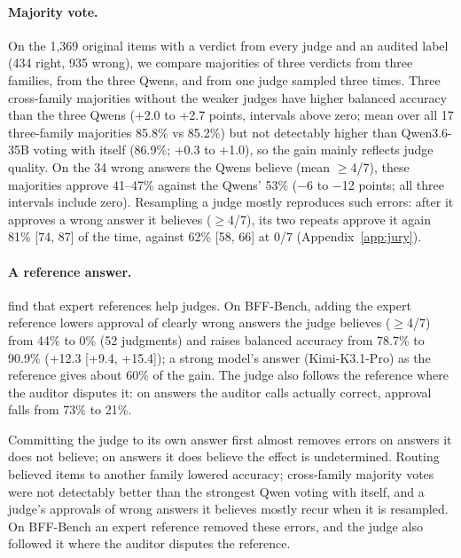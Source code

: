 \documentclass[11pt]{article}
\newcounter{takeaway}
\begin{document}
\paragraph{Majority vote.}
On the 1,369 original items with a verdict from every judge and an audited label (434 right, 935 wrong), we compare
majorities of three verdicts from three families, from the three Qwens, and from one judge sampled three times. Three
cross-family majorities without the weaker judges have higher balanced accuracy than the three Qwens (+2.0 to +2.7
points, intervals above zero; mean over all 17 three-family majorities 85.8\% vs 85.2\%) but not detectably higher
than Qwen3.6-35B voting with itself (86.9\%; +0.3 to +1.0), so the gain mainly reflects judge quality. On the 34
wrong answers the Qwens believe (mean $\geq$4/7), these majorities approve 41--47\% against the Qwens' 53\% ($-$6
to $-$12 points; all three intervals include zero). Resampling a judge mostly reproduces such errors: after it approves a
wrong answer it believes ($\geq$4/7), its two repeats approve it again 81\% [74, 87] of the time, against 62\% [58,
66] at 0/7 (Appendix~\ref{app:jury}).

\paragraph{A reference answer.}
\citet{krumdick2026nofreelabels} find that expert references help judges. On BFF-Bench, adding the expert reference
lowers approval of clearly wrong answers the judge believes ($\geq$4/7) from 44\% to 0\% (52 judgments) and raises
balanced accuracy from 78.7\% to 90.9\% (+12.3 [+9.4, +15.4]); a strong model's answer (Kimi-K3.1-Pro) as the
reference gives about 60\% of the gain. The judge also follows the reference where the auditor disputes it: on
answers the auditor calls actually correct, approval falls from 73\% to 21\%.

\begin{takeaway}
Committing the judge to its own answer first almost removes errors on answers it does not believe; on answers it does
believe the effect is undetermined. Routing believed items to another family lowered accuracy; cross-family majority
votes were not detectably better than the strongest Qwen voting with itself, and a judge's approvals of wrong answers
it believes mostly recur when it is resampled. On BFF-Bench an expert reference removed these errors, and the judge
also followed it where the auditor disputes the reference.
\end{takeaway}
\end{document}

